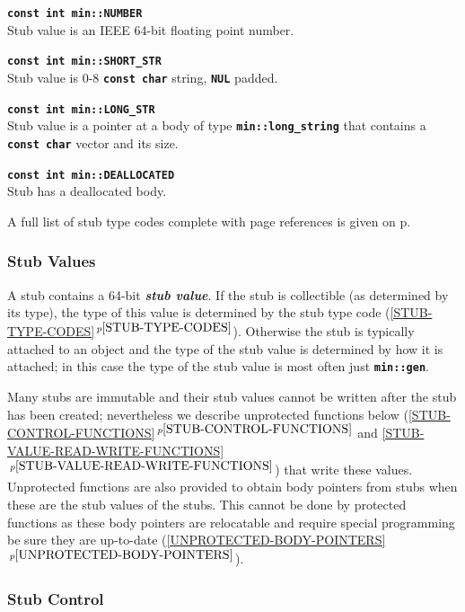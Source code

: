 \documentclass[12pt]{article}
\newcommand{\TT}[1]{{\tt \bfseries #1}}
\newcommand{\key}[1]{{\bf \em #1}\index{#1}}
\newcommand{\itemref}[1]{\ref{#1}$\,^{p\pageref{#1}}$}
\newcommand{\pagref}[1]{p\pageref{#1}}
\newcommand{\EOL}{\penalty \exhyphenpenalty}
\newenvironment{indpar}[1][0.3in]%
	{\begin{list}{}%
		     {\setlength{\itemsep}{0in}%
		      \setlength{\topsep}{0in}%
		      \setlength{\parsep}{1ex}%
		      \setlength{\labelwidth}{#1}%
		      \setlength{\leftmargin}{#1}%
		      \addtolength{\leftmargin}{\labelsep}}%
	 \item}%
	{\end{list}}
\begin{document}
\begin{indpar}
\begin{list}{}{}
\item[\TT{const int min::NUMBER}]~\\
Stub value is an IEEE 64-bit floating point number.
\item[\TT{const int min::SHORT\_STR}]~\\
Stub value is 0-8 \TT{const char} string, \TT{NUL} padded.
\item[\TT{const int min::LONG\_STR}]~\\
Stub value is a pointer at a body of type \TT{min::long\_\EOL string}
that contains a \TT{const char} vector and its size. 
\item[\TT{const int min::DEALLOCATED}]~\\
Stub has a deallocated body.
\end{list}
\end{indpar}

A full list of stub type codes complete with page references
is given on \pagref{STUB-TYPE-CODE-LIST}.

\subsubsection{Stub Values}
\label{STUB-VALUES}

A stub contains a 64-bit \key{stub value}.  If the stub is collectible
(as determined by its type), the type of this value
is determined by the stub type code (\itemref{STUB-TYPE-CODES}).
Otherwise the stub is typically attached to an object and the type of the stub
value is determined by how it is attached; in this case the type of the
stub value is most often just \TT{min::gen}.

Many stubs are immutable
and their stub values cannot be written after the stub has been created;
nevertheless we describe unprotected functions
below (\itemref{STUB-CONTROL-FUNCTIONS} and
\itemref{STUB-VALUE-READ-WRITE-FUNCTIONS}) that
write these values.  Unprotected functions are also provided to obtain
body pointers from stubs when these are the stub values of the stubs.
This cannot be done by protected
functions as these body pointers are relocatable and require special
programming be sure they are up-to-date (\itemref{UNPROTECTED-BODY-POINTERS}).

\subsubsection{Stub Control}
\label{STUB-CONTROL}
\end{document}
